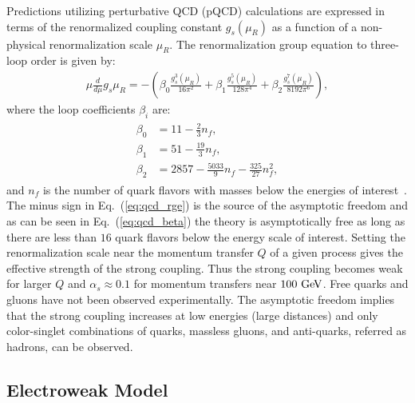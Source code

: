 Predictions utilizing perturbative QCD (pQCD) calculations are expressed in terms of the renormalized coupling constant $g_{s} (\mu_R)$ as a function of a non-physical renormalization scale $\mu_R$. The renormalization group equation to three-loop order is given by:
\begin{eqnarray} \label{eq:qcd_rge}
\mu\frac{d}{d\mu}g_s{\mu_R} = - (\beta_{0} \frac{g_{s}^{3}(\mu_R)}{16\pi^2} +  \beta_{1} \frac{g_{s}^{5}(\mu_R)}{128\pi^4} + \beta_{2} \frac{g_{s}^{7}(\mu_R)}{8192\pi^6}),
\end{eqnarray}
where the loop coefficients $\beta_{i}$ are:
\begin{eqnarray} \label{eq:qcd_beta}
\begin{aligned}
\beta_{0}&=11-\frac{2}{3}n_{f}, \\
\beta_{1}&=51-\frac{19}{3}n_{f}, \\
\beta_{2}&=2857-\frac{5033}{9}n_{f}-\frac{325}{27}n_{f}^2,
\end{aligned}
\end{eqnarray}
and $n_{f}$ is the number of quark flavors with masses below the energies of interest~\cite{Agashe:2014kda}. The minus sign in Eq.~(\ref{eq:qcd_rge}) is the source of the asymptotic freedom and as can be seen in Eq.~(\ref{eq:qcd_beta}) the theory is asymptotically free as long as there are less than $16$ quark flavors below the energy scale of interest. Setting the renormalization scale near the momentum transfer $Q$ of a given process gives the effective strength of the strong coupling. Thus the strong coupling becomes weak for larger $Q$ and $\alpha_{s} \approx 0.1$ for momentum transfers near $100~\mathrm{Ge\kern -0.1em V}$. Free quarks and gluons have not been observed experimentally. The asymptotic freedom implies that the strong coupling increases at low energies (large distances) and only color-singlet combinations of quarks, massless gluons, and anti-quarks, referred as hadrons, can be observed.  
 
\subsection{Electroweak Model}

